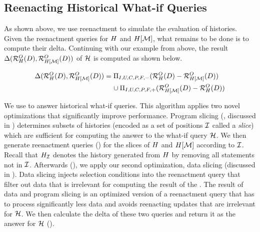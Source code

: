 \subsection{Reenacting Historical What-if Queries}
\label{sec:answ-hist-what}

As shown above, we use reenactment to simulate the evaluation of histories. Given the reenactment queries for $H$ and $H[\mathcal{M}]$, what remains to be done is to compute their delta.
Continuing with our example from above, the result $\Delta(\mathcal{R}^{O}_{H}(D),\mathcal{R}^{O}_{H[\mathcal{M}]}(D))$ of $\mathcal{H}$ is computed as shown below.

\begin{align*}
  \Delta(\mathcal{R}^{O}_{H}(D),\mathcal{R}^{O}_{H[\mathcal{M}]}(D))&=  \Pi_{I,U,C,P,F,-}(\mathcal{R}^{O}_{H}(D)- \mathcal{R}^{O}_{H[\mathcal{M}]}(D))\\
                                                                            &\hspace{4mm}  \cup \Pi_{I,U,C,P,F,+}(\mathcal{R}^{O}_{H[\mathcal{M}]}(D)-\mathcal{R}^{O}_{H}(D))
\end{align*}

We use  to answer historical what-if queries. This algorithm applies two novel optimizations that significantly improve  performance. Program slicing (, discussed in )  determines subsets of histories (encoded as a set of positions $\mathcal{I}$ called a \emph{slice}) which are sufficient for computing the answer to the what-if query $\mathcal{H}$. We then generate reenactment queries ()  for the slices of $H$ and $H[\mathcal{M}]$ according to $\mathcal{I}$. Recall that ${H}_{\mathcal{I}}$ denotes the history generated from $H$ by removing all statements not in $\mathcal{I}$. Afterwards (), we apply our second optimization, data slicing (discussed in ). Data slicing injects selection conditions into the reenactment query that filter out data that is irrelevant for computing the result of the \abbrHW. The result of data and program slicing is an optimized version of a reenactment query that has to process significantly less data and avoids reenacting updates that are irrelevant for $\mathcal{H}$. We then calculate the delta of these two queries and return it as the answer for $\mathcal{H}$ ().







